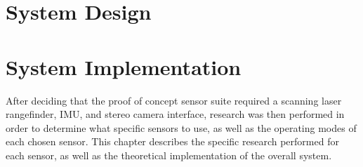 \documentclass[12pt]{article}
\begin{document}

\newpage

\doublespacing

\tableofcontents %
\newpage

\begin{small} %
\listoffigures %
\end{small}
\newpage 



\newpage
\newpage
{} %


\newpage

\newpage
\section{System Design}


\newpage
\section{System Implementation}
After deciding that the proof of concept sensor suite required a scanning laser rangefinder, IMU, and stereo camera interface, research was then performed in order to determine what specific sensors to use, as well as the operating modes of each chosen sensor. This chapter describes the specific research performed for each sensor, as well as the theoretical implementation of the overall system.














\end{document}
